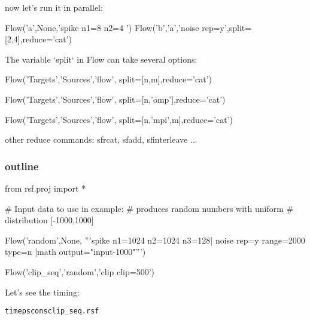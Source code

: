 \begin{frame}[fragile] 
now let's run it in parallel:
\begin{python}
Flow('a',None,'spike n1=8 n2=4 ')
Flow('b','a','noise rep=y',split=[2,4],reduce='cat')
\end{python}
\end{frame}



\begin{frame}
\end{frame}



\begin{frame}[fragile]
The variable `split` in Flow can take several options:
\begin{python} 
Flow('Targets','Sources','flow',
     split=[n,m],reduce='cat') 
\end{python}
\pause
\begin{python} 
Flow('Targets','Sources','flow',
     split=[n,'omp'],reduce='cat') 
\end{python}
\pause
\begin{python} 
Flow('Targets','Sources','flow',
     split=[n,'mpi',m],reduce='cat') 
\end{python}

other reduce commands: sfrcat, sfadd, sfinterleave ...
\end{frame}




\begin{frame} \frametitle{outline}
\vfill 
{}
\vfill  
{}
\vfill 
{}
\vfill 
\end{frame}





\begin{frame}[fragile]
\begin{python}
from rsf.proj import * 

# Input data to use in example:
# produces random numbers with uniform 
# distribution [-1000,1000]

Flow('random',None,
    '''spike n1=1024 n2=1024 n3=128|
       noise rep=y range=2000  type=n
      |math output="input-1000"''')

Flow('clip_seq','random','clip clip=500')
\end{python}

Let's see the timing:

   \begin{alltt}
   time pscons clip_seq.rsf
   \end{alltt}
\end{frame}




